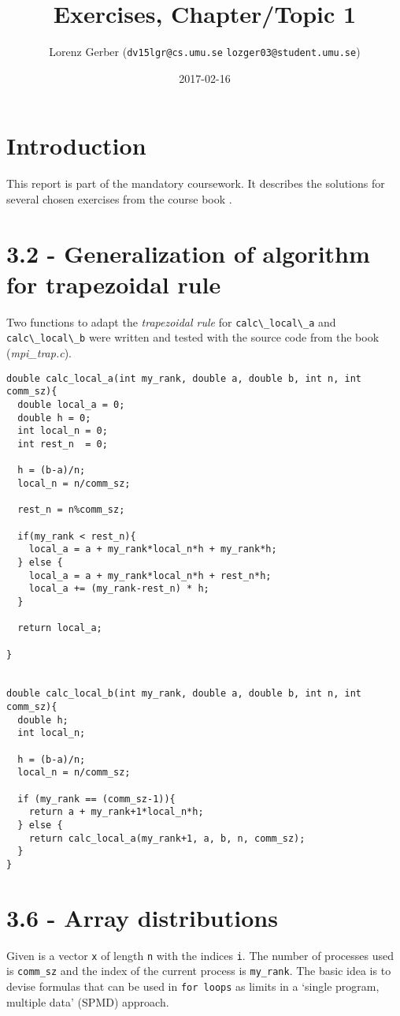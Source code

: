 \documentclass[a4paper,11pt,twoside]{article}
\title{Exercises, Chapter/Topic 1}
\author{Lorenz Gerber ({\tt{dv15lgr@cs.umu.se}} {\tt{lozger03@student.umu.se}})}
\date{2017-02-16}
\begin{document}
\lstset{language=C}
\maketitle
\thispagestyle{empty}
\newpage
\tableofcontents
\thispagestyle{empty}
\newpage

\clearpage
{}

\section{Introduction}
This report is part of the mandatory coursework. It describes the solutions for several chosen exercises from the course book \cite{pacheco2011}.

\section{3.2 - Generalization of algorithm for trapezoidal rule}
Two functions to adapt the \textit{trapezoidal rule} for \verb+calc\_local\_a+ and \verb+calc\_local\_b+ were written and tested with the source code from the book (\textit{mpi\_trap.c}).

\begin{verbatim}
double calc_local_a(int my_rank, double a, double b, int n, int comm_sz){
  double local_a = 0;
  double h = 0;
  int local_n = 0;
  int rest_n  = 0;

  h = (b-a)/n;
  local_n = n/comm_sz;

  rest_n = n%comm_sz;

  if(my_rank < rest_n){
    local_a = a + my_rank*local_n*h + my_rank*h;
  } else {
    local_a = a + my_rank*local_n*h + rest_n*h;
    local_a += (my_rank-rest_n) * h;
  }

  return local_a;

}


double calc_local_b(int my_rank, double a, double b, int n, int comm_sz){
  double h;
  int local_n;

  h = (b-a)/n;
  local_n = n/comm_sz;

  if (my_rank == (comm_sz-1)){
    return a + my_rank+1*local_n*h;
  } else {
    return calc_local_a(my_rank+1, a, b, n, comm_sz);
  }
}

\end{verbatim}

\section{3.6 - Array distributions}
Given is a vector \verb+x+ of length \verb+n+ with the indices \verb+i+. The number of processes used is \verb+comm_sz+ and the index of the current process is \verb+my_rank+. The basic idea is to devise formulas that can be used in \verb+for loops+ as limits in a `single program, multiple data' (SPMD) approach.
\end{document}

